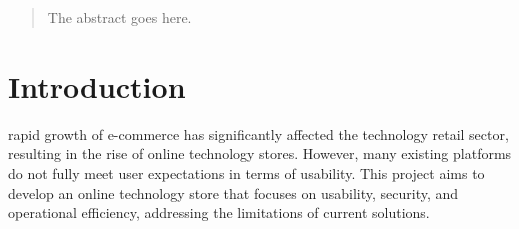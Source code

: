 \documentclass[a4paper,journal]{IEEEtran}
\begin{document}







\maketitle

\begin{abstract}
The abstract goes here.
\end{abstract}







%
\IEEEpeerreviewmaketitle



\section{Introduction}
%
%
%
%
rapid growth of e-commerce has significantly affected the technology retail
sector, resulting in the rise of online technology stores.
However, many existing platforms do not fully meet user expectations in terms of
usability.
This project aims to develop an online technology store that focuses on
usability, security, and operational efficiency, addressing the limitations of
current solutions.
\end{document}
